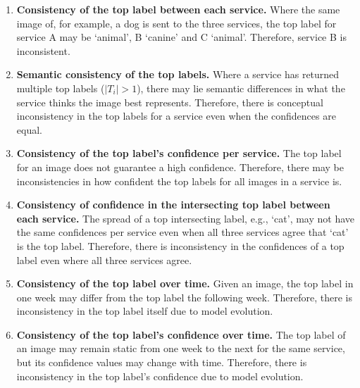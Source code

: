 \begin{enumerate}[label=\textbf{(\arabic*)}]
  \item \textbf{Consistency of the top label between each service.} Where the same image of, for example, a dog is sent to the three services, the top label for service A may be `animal', B `canine' and C `animal'. Therefore, service B is inconsistent.
  \item \textbf{Semantic consistency of the top labels.} Where a service has returned multiple top labels ($| T_{i} | > 1$), there may lie semantic differences in what the service thinks the image best represents. Therefore, there is conceptual inconsistency in the top labels for a service even when the confidences are equal.
  \item \textbf{Consistency of the top label's confidence per service.} The top label for an image does not guarantee a high confidence. Therefore, there may be inconsistencies in how confident the top labels for all images in a service is.
  \item \textbf{Consistency of confidence in the intersecting top label between each service.} The spread of a top intersecting label, e.g., `cat', may not have the same confidences per service even when all three services agree that `cat' is the top label. Therefore, there is inconsistency in the confidences of a top label even where all three services agree.
  \item \textbf{Consistency of the top label over time.} Given an image, the top label in one week may differ from the top label the following week. Therefore, there is inconsistency in the top label itself due to model evolution.
  \item \textbf{Consistency of the top label's confidence over time.} The top label of an image may remain static from one week to the next for the same service, but its confidence values may change with time. Therefore, there is inconsistency in the top label's confidence due to model evolution.
\end{enumerate}

